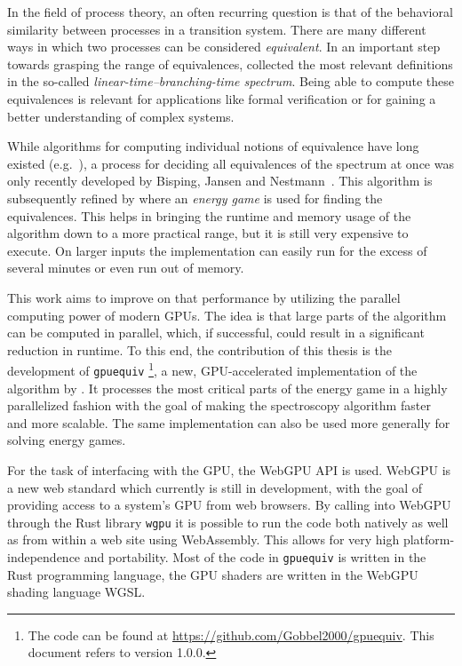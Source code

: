 In the field of process theory,
an often recurring question is that of
the behavioral similarity between processes in a transition system.
There are many different ways in which two processes can be considered
\emph{equivalent}.
In an important step towards grasping the range of equivalences,
\textcite{glabbeek1990spectrum} collected the most relevant definitions in the
so-called \emph{linear-time--branching-time spectrum}.
Being able to compute these equivalences is relevant for applications like
formal verification
or for gaining a better understanding of complex systems.

While algorithms for computing individual notions of equivalence
have long existed (e.g.~\cite{Blom2002}),
a process for deciding all equivalences of the spectrum at once
was only recently developed
by Bisping, Jansen and Nestmann~\cite{Bisping2022}.
This algorithm is subsequently refined by \textcite{bisping2023process}
where an \emph{energy game} is used for finding the equivalences.
This helps in bringing the runtime and memory usage of the algorithm down
to a more practical range,
but it is still very expensive to execute.
On larger inputs the implementation can easily run for the excess of several
minutes or even run out of memory.

This work aims to improve on that performance by utilizing the parallel
computing power of modern GPUs.
The idea is that large parts of the algorithm can be computed in parallel,
which, if successful, could result in a significant reduction in runtime.
To this end, the contribution of this thesis is the development
of \texttt{gpuequiv}%
\footnote{The code can be found at \url{https://github.com/Gobbel2000/gpuequiv}.
This document refers to version 1.0.0.},
a new, GPU-accelerated implementation
of the algorithm by \textcite{bisping2023process}.
It processes the most critical parts of the energy game in a highly
parallelized fashion
with the goal of making the spectroscopy algorithm faster and more scalable.
The same implementation can also be used more generally for solving energy
games.

For the task of interfacing with the GPU,
the WebGPU API is used.
WebGPU is a new web standard which currently is still in development,
with the goal of providing access to a system's GPU from web browsers.
By calling into WebGPU through the Rust library \texttt{wgpu} it is possible to
run the code both natively as well as from within a web site using WebAssembly.
This allows for very high platform-independence and portability.
Most of the code in \texttt{gpuequiv} is written in the
Rust programming language,
the GPU shaders are written in the WebGPU shading language WGSL\@.

